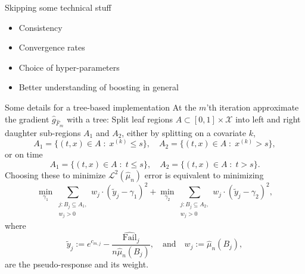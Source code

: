 \documentclass{beamer}\usepackage{listings}
\begin{document}
\begin{frame}[label={sec:org8faf8e4}]{Skipping some technical stuff}
\begin{itemize}
\item Consistency
\item Convergence rates
\item Choice of hyper-parameters
\item Better understanding of boosting in general
\end{itemize}
\end{frame}
\begin{frame}[label={sec:orgbdd7121}]{Some details for a tree-based implementation}
At the $m$'th iteration approximate the gradient $\hat{g}_{\hat{F}_m}$ with a tree: Split leaf
regions $A \subset [0,1] \times \mathscr{X}$ into left and right daughter sub-regions $A_1$ and
$A_2$, either by splitting on a covariate $k$,
\begin{equation*}
  A_1 = \{(t, x) \in A \; : \; x^{(k)} \leq s\}, \quad   A_2 = \{(t, x) \in A \; : \; x^{(k)} > s\},
\end{equation*}
or on time
\begin{equation*}
  A_1 = \{(t, x) \in A \; : \; t \leq s\}, \quad   A_2 = \{(t, x) \in A \; : \; t > s\}.
\end{equation*}
\pause Choosing these to minimize $\mathcal{L}^2(\hat{\mu}_n)$ error is equivalent to minimizing
\begin{equation*}
  \min_{\gamma_1} \sum_{\substack{j: B_j \subseteq A_1, \\ w_j > 0}} w_j \cdot (\tilde{y}_j - \gamma_1)^2
  +   \min_{\gamma_2} \sum_{\substack{j: B_j \subseteq A_2, \\ w_j > 0}} w_j \cdot (\tilde{y}_j - \gamma_2)^2,
\end{equation*}
where
\begin{equation*}
  \tilde{y}_j := e^{c_{m,j}} - \frac{\hat{\mathrm{Fail}}_j}{n \hat{\mu}_n(B_j)}, \quad \text{and}
  \quad w_j := \hat{\mu}_n(B_j),
\end{equation*}
are the pseudo-response and its weight. 
\end{frame}
\end{document}
